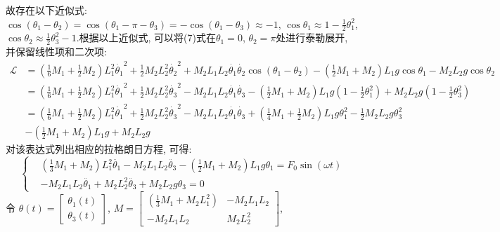 \documentclass[10.5pt,a4paper]{ctexart}
\begin{document}
故存在以下近似式: $\displaystyle \cos{\left(\theta_1 - \theta_2\right)} = \cos{\left(\theta_1 - \pi - \theta_3\right)} = -\cos{\left(\theta_1 - \theta_3\right)} \approx -1$, 
$\displaystyle\cos{\theta_1} \approx 1 - \frac{1}{2}\theta_1^2$, $\displaystyle\cos{\theta_2} \approx \frac{1}{2}\theta_3^2 - 1$.根据以上近似式, 可以将(7)式在$\theta_1 = 0$, $\theta_2 = \pi$处进行泰勒展开, 并保留线性项和二次项:
\begin{equation}
\begin{split}
\mathcal{L} & = \left(\frac{1}{6}M_1 + \frac{1}{2}M_2\right)L_1^2\dot{\theta_1}^2 + \frac{1}{2}M_2 L_2^2 \dot{\theta_2}^2 + M_2L_1L_2 \dot{\theta_1} \dot{\theta_2}\cos{\left(\theta_1 - \theta_2\right)} - \left(\frac{1}{2}M_1 + M_2\right)L_1 g \cos{\theta_1} - M_2 L_2 g \cos{\theta_2} \\
& = \left(\frac{1}{6}M_1 + \frac{1}{2}M_2\right)L_1^2\dot{\theta_1}^2 + \frac{1}{2}M_2 L_2^2 \dot{\theta_3}^2 - M_2L_1L_2 \dot{\theta_1} \dot{\theta_3} - \left(\frac{1}{2}M_1 + M_2\right)L_1 g \left(1 - \frac{1}{2} \theta_1^2\right) + M_2 L_2 g \left(1 - \frac{1}{2}\theta_3^2 \right) \\
& = \left(\frac{1}{6}M_1 + \frac{1}{2}M_2\right)L_1^2\dot{\theta_1}^2 + \frac{1}{2}M_2 L_2^2 \dot{\theta_3}^2 - M_2L_1L_2 \dot{\theta_1} \dot{\theta_3} + \left(\frac{1}{4}M_1 + \frac{1}{2}M_2\right) L_1 g \theta_1^2 - \frac{1}{2}M_2 L_2 g \theta_3^2 \\ 
& - \left(\frac{1}{2}M_1 + M_2\right) L_1 g  + M_2 L_2 g
\end{split}
\end{equation}
对该表达式列出相应的拉格朗日方程, 可得:
\begin{equation}
\left \{ 
  \begin{aligned}
  &\left(\frac{1}{3}M_1 + M_2\right) L_1^2 \ddot{\theta_1}  - M_2 L_1 L_2 \ddot{\theta_3} - (\frac{1}{2}M_1 + M_2) L_1 g \theta_1 = F_0 \sin{\left(\omega t\right)}\\
  &-M_2L_1L_2\ddot{\theta_1} + M_2L_2^2\ddot{\theta_3}  + M_2L_2g\theta_3 = 0
  \end{aligned}
\right.
\end{equation}
令 $\theta(t) = \begin{bmatrix} \theta_1(t) \\ \theta_3(t) \end{bmatrix}$, $\displaystyle M = \begin{bmatrix} \left(\frac{1}{3}M_1 + M_2 L_1^2 \right) & -M_2L_1L_2\\-M_2L_1L_2 &  M_2L_2^2\end{bmatrix}$,
\end{document}
